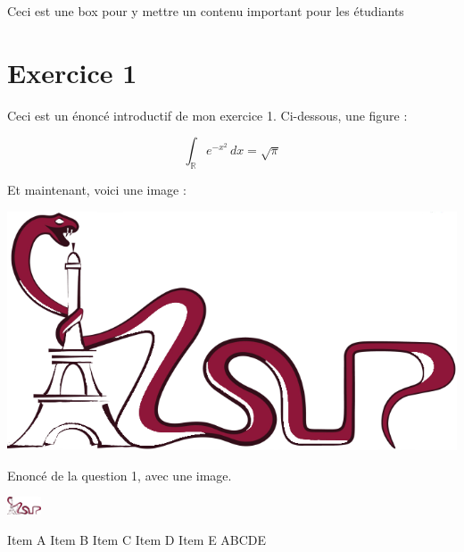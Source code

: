 \documentclass[12pt]{article}
\begin{document}
\recto
\grille


\begin{motRM}[
        titre=Mot de votre RM,
    ]
    Ceci est une box pour y mettre un contenu important pour les étudiants 
\end{motRM}

\newpage


\section*{Exercice 1}

\inseparable %

Ceci est un énoncé introductif de mon exercice 1. Ci-dessous, une figure :

$$
\int_{\mathbb R} e^{-x^2}\, dx = \sqrt{\pi}
$$

Et maintenant, voici une image :

\includegraphics[width=0.2\linewidth]{logo.png}

{
    Enoncé de la question 1, avec une image.
    
    \begin{center}
        \includegraphics[width=1cm]{logo.png}
    \end{center}
}
{Item A}
{Item B}
{Item C}
{Item D}
{Item E}
{ABCDE}
\end{document}
